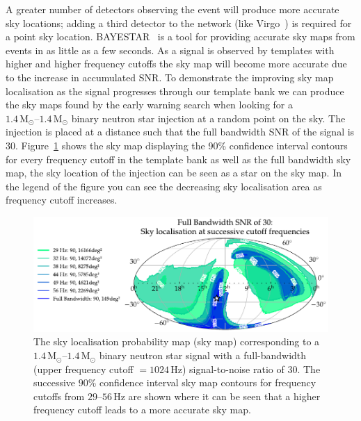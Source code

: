 A greater number of detectors observing the event will produce more accurate sky locations; adding a third detector to the network (like Virgo~\cite{aVirgo:2015}) is required for a point sky location. BAYESTAR~\cite{BAYESTAR:2016} is a tool for providing accurate sky maps from \gwadj events in as little as a few seconds. As a \gwadj signal is observed by templates with higher and higher frequency cutoffs the sky map will become more accurate due to the increase in accumulated SNR. To demonstrate the improving sky map localisation as the signal progresses through our template bank we can produce the sky maps found by the early warning search when looking for a $1.4 \, \text{M$_\odot$}\text{--}1.4 \, \text{M$_\odot$}$ binary neutron star injection at a random point on the sky. The \gwadj injection is placed at a distance such that the full bandwidth SNR of the signal is $30$. Figure~\ref{6:fig:ew_30SNR_multiple} shows the sky map displaying the 90\% confidence interval contours for every frequency cutoff in the template bank as well as the full bandwidth sky map, the sky location of the injection can be seen as a star on the sky map. In the legend of the figure you can see the decreasing sky localisation area as frequency cutoff increases.
%
\begin{figure}
    \centering
    \includegraphics[width=\textwidth]{images/6_earlywarning/localisation/30SNR_multiple.pdf}
    \caption{The \gwadj sky localisation probability map (sky map) corresponding to a $1.4 \, \text{M$_\odot$}\text{--}1.4 \, \text{M$_\odot$}$ binary neutron star signal with a full-bandwidth (upper frequency cutoff $= 1024 \, \text{Hz}$) signal-to-noise ratio of $30$. The successive $90\%$ confidence interval sky map contours for frequency cutoffs from $29\text{--}56 \, \text{Hz}$ are shown where it can be seen that a higher frequency cutoff leads to a more accurate sky map.}
    \label{6:fig:ew_30SNR_multiple}
\end{figure}
%
